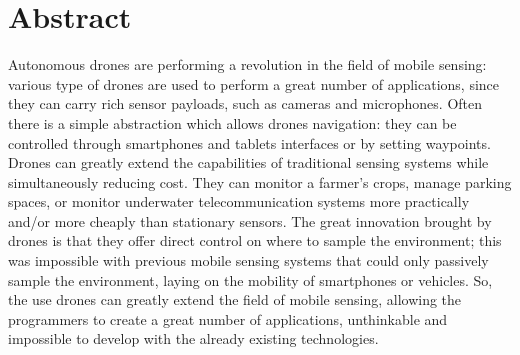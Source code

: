 \chapter*{Abstract}


Autonomous drones are performing a revolution in the field of mobile sensing:
various type of drones are used to perform a great number of applications, since they can carry rich sensor payloads, such as cameras and microphones.
Often there is a simple abstraction which allows drones navigation: they can be controlled through smartphones and tablets interfaces or by setting waypoints.
Drones can greatly extend the capabilities of traditional sensing systems while simultaneously reducing cost.
They can monitor a farmer’s crops, manage parking spaces, or monitor underwater telecommunication systems more practically and/or more cheaply than stationary sensors.
The great innovation brought by drones is that they offer direct control on where to sample the environment; this was impossible with previous mobile sensing systems that could only passively sample the environment, laying on the mobility of smartphones or vehicles.
So, the use drones can greatly extend the field of mobile sensing, allowing the programmers to create a great number of applications, unthinkable and impossible to develop with the already existing technologies.
